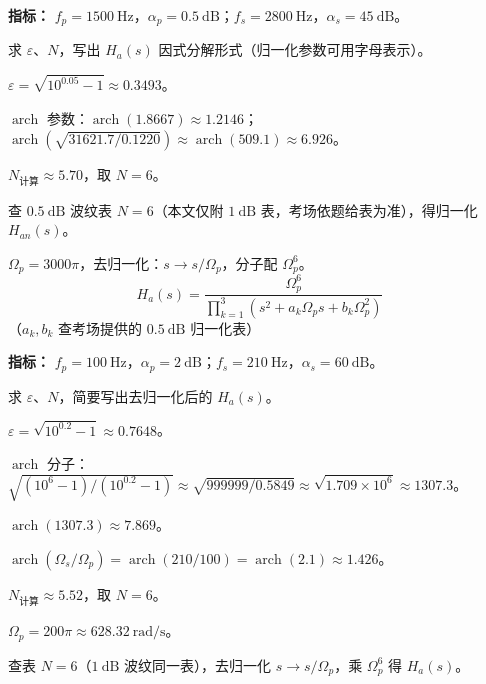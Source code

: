 \documentclass[12pt,a4paper]{ctexart}
\newcommand{\Omegap}{\Omega_p}
\newcommand{\Omegas}{\Omega_s}
\newcommand{\db}{\ \mathrm{dB}}
\newcommand{\Hz}{\ \mathrm{Hz}}
\newcommand{\rads}{\ \mathrm{rad/s}}
\newcommand{\Han}{H_{\!a}(s)}
\newcommand{\HanNorm}{H_{\!an}(s)}
\newcommand{\arch}{\operatorname{arch}}
\begin{document}
\vspace{16pt}

\begin{tcolorbox}[enhanced, colback=white, colframe=black!40,
    title={\textbf{练习 3：切比雪夫 I 型·标准设计}}, fonttitle=\bfseries, sharp corners, breakable]

\textbf{指标：} $f_p = 1500\Hz$，$\alpha_p = 0.5\db$；$f_s = 2800\Hz$，$\alpha_s = 45\db$。

求 $\varepsilon$、$N$，写出 $\Han$ 因式分解形式（归一化参数可用字母表示）。
\end{tcolorbox}

\vspace{4pt}
\begin{answerbox}
$\varepsilon = \sqrt{10^{0.05}-1} \approx 0.3493$。

$\arch$ 参数：$\arch(1.8667) \approx 1.2146$；$\arch(\sqrt{31621.7/0.1220}) \approx \arch(509.1) \approx 6.926$。

$N_{\text{计算}} \approx 5.70$，取 $N = 6$。

查 $0.5\db$ 波纹表 $N=6$（本文仅附 $1\db$ 表，考场依题给表为准），得归一化 $\HanNorm$。

$\Omegap = 3000\pi$，去归一化：$s \to s/\Omegap$，分子配 $\Omegap^6$。
\[
\Han = \frac{\Omegap^6}{\prod_{k=1}^{3}(s^2 + a_k\Omegap s + b_k\Omegap^2)}
\]
（$a_k, b_k$ 查考场提供的 $0.5\db$ 归一化表）
\end{answerbox}

\vspace{16pt}

\begin{tcolorbox}[enhanced, colback=white, colframe=black!40,
    title={\textbf{练习 4：切比雪夫 I 型·大衰减考验}}, fonttitle=\bfseries, sharp corners, breakable]

\textbf{指标：} $f_p = 100\Hz$，$\alpha_p = 2\db$；$f_s = 210\Hz$，$\alpha_s = 60\db$。

求 $\varepsilon$、$N$，简要写出去归一化后的 $\Han$。
\end{tcolorbox}

\vspace{4pt}
\begin{answerbox}
$\varepsilon = \sqrt{10^{0.2}-1} \approx 0.7648$。

$\arch$ 分子：$\sqrt{(10^6-1)/(10^{0.2}-1)} \approx \sqrt{999999/0.5849} \approx \sqrt{1.709\times10^6} \approx 1307.3$。

$\arch(1307.3) \approx 7.869$。

$\arch(\Omegas/\Omegap) = \arch(210/100) = \arch(2.1) \approx 1.426$。

$N_{\text{计算}} \approx 5.52$，取 $N = 6$。

$\Omegap = 200\pi \approx 628.32\rads$。

查表 $N=6$（$1\db$ 波纹同一表），去归一化 $s \to s/\Omegap$，乘 $\Omegap^6$ 得 $\Han$。
\end{answerbox}
\end{document}
